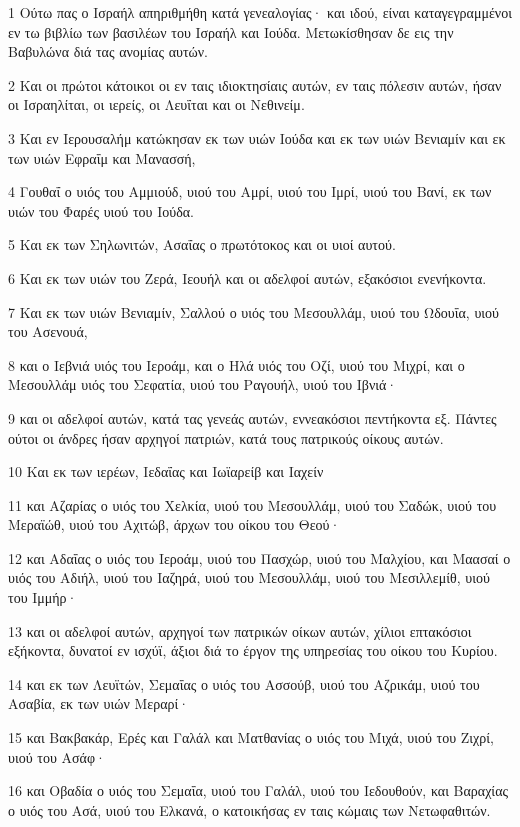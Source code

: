 \par 1 Ούτω πας ο Ισραήλ απηριθμήθη κατά γενεαλογίας· και ιδού, είναι καταγεγραμμένοι εν τω βιβλίω των βασιλέων του Ισραήλ και Ιούδα. Μετωκίσθησαν δε εις την Βαβυλώνα διά τας ανομίας αυτών.
\par 2 Και οι πρώτοι κάτοικοι οι εν ταις ιδιοκτησίαις αυτών, εν ταις πόλεσιν αυτών, ήσαν οι Ισραηλίται, οι ιερείς, οι Λευΐται και οι Νεθινείμ.
\par 3 Και εν Ιερουσαλήμ κατώκησαν εκ των υιών Ιούδα και εκ των υιών Βενιαμίν και εκ των υιών Εφραΐμ και Μανασσή,
\par 4 Γουθαΐ ο υιός του Αμμιούδ, υιού του Αμρί, υιού του Ιμρί, υιού του Βανί, εκ των υιών του Φαρές υιού του Ιούδα.
\par 5 Και εκ των Σηλωνιτών, Ασαΐας ο πρωτότοκος και οι υιοί αυτού.
\par 6 Και εκ των υιών του Ζερά, Ιεουήλ και οι αδελφοί αυτών, εξακόσιοι ενενήκοντα.
\par 7 Και εκ των υιών Βενιαμίν, Σαλλού ο υιός του Μεσουλλάμ, υιού του Ωδουΐα, υιού του Ασενουά,
\par 8 και ο Ιεβνιά υιός του Ιεροάμ, και ο Ηλά υιός του Οζί, υιού του Μιχρί, και ο Μεσουλλάμ υιός του Σεφατία, υιού του Ραγουήλ, υιού του Ιβνιά·
\par 9 και οι αδελφοί αυτών, κατά τας γενεάς αυτών, εννεακόσιοι πεντήκοντα εξ. Πάντες ούτοι οι άνδρες ήσαν αρχηγοί πατριών, κατά τους πατρικούς οίκους αυτών.
\par 10 Και εκ των ιερέων, Ιεδαΐας και Ιωϊαρείβ και Ιαχείν
\par 11 και Αζαρίας ο υιός του Χελκία, υιού του Μεσουλλάμ, υιού του Σαδώκ, υιού του Μεραϊώθ, υιού του Αχιτώβ, άρχων του οίκου του Θεού·
\par 12 και Αδαΐας ο υιός του Ιεροάμ, υιού του Πασχώρ, υιού του Μαλχίου, και Μαασαί ο υιός του Αδιήλ, υιού του Ιαζηρά, υιού του Μεσουλλάμ, υιού του Μεσιλλεμίθ, υιού του Ιμμήρ·
\par 13 και οι αδελφοί αυτών, αρχηγοί των πατρικών οίκων αυτών, χίλιοι επτακόσιοι εξήκοντα, δυνατοί εν ισχύϊ, άξιοι διά το έργον της υπηρεσίας του οίκου του Κυρίου.
\par 14 και εκ των Λευϊτών, Σεμαΐας ο υιός του Ασσούβ, υιού του Αζρικάμ, υιού του Ασαβία, εκ των υιών Μεραρί·
\par 15 και Βακβακάρ, Ερές και Γαλάλ και Ματθανίας ο υιός του Μιχά, υιού του Ζιχρί, υιού του Ασάφ·
\par 16 και Οβαδία ο υιός του Σεμαΐα, υιού του Γαλάλ, υιού του Ιεδουθούν, και Βαραχίας ο υιός του Ασά, υιού του Ελκανά, ο κατοικήσας εν ταις κώμαις των Νετωφαθιτών.
